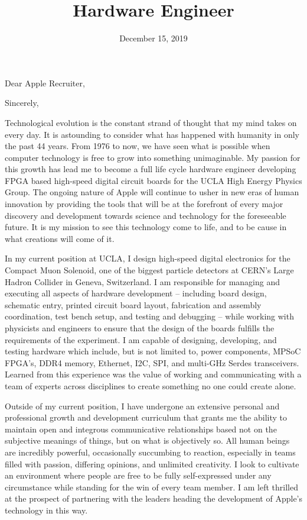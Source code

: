 \documentclass[11pt,a4paper,sans]{moderncv}        %
\title{Hardware Engineer}                               %
\begin{document}
\date{December 15, 2019}
\opening{Dear Apple Recruiter,}
\closing{Sincerely,}
\makelettertitle

Technological evolution is the constant strand of thought that my mind takes on every day. It is astounding to consider what has happened with humanity in only the past 44 years. From 1976 to now, we have seen what is possible when computer technology is free to grow into something unimaginable. My passion for this growth has lead me to become a full life cycle hardware engineer developing FPGA based high-speed digital circuit boards for the UCLA High Energy Physics Group. The ongoing nature of Apple will continue to usher in new eras of human innovation by providing the tools that will be at the forefront of every major discovery and development towards science and technology for the foreseeable future. It is my mission to see this technology come to life, and to be cause in what creations will come of it.

In my current position at UCLA, I design high-speed digital electronics for the Compact Muon Solenoid, one of the biggest particle detectors at CERN's Large Hadron Collider in Geneva, Switzerland. I am responsible for managing and executing all aspects of hardware development -- including board design, schematic entry, printed circuit board layout, fabrication and assembly coordination, test bench setup, and testing and debugging -- while working with physicists and engineers to ensure that the design of the boards fulfills the requirements of the experiment. I am capable of designing, developing, and testing hardware which include, but is not limited to, power components, MPSoC FPGA's, DDR4 memory, Ethernet, I2C, SPI, and multi-GHz Serdes transceivers. Learned from this experience was the value of working and communicating with a team of experts across disciplines to create something no one could create alone.

Outside of my current position, I have undergone an extensive personal and professional growth and development curriculum that grants me the ability to maintain open and integrous communicative relationships based not on the subjective meanings of things, but on what is objectively so. All human beings are incredibly powerful, occasionally succumbing to reaction, especially in teams filled with passion, differing opinions, and unlimited creativity. I look to cultivate an environment where people are free to be fully self-expressed under any circumstance while standing for the win of every team member. I am left thrilled at the prospect of partnering with the leaders heading the development of Apple's technology in this way.
\end{document}
